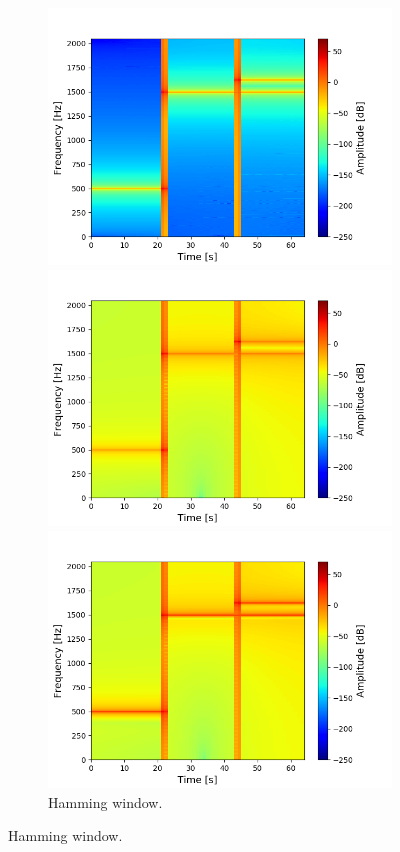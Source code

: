 \begin{figure}[H]
\centering
\begin{subfigure}{0.49\textwidth}
\centering

\includegraphics[width=\textwidth]{figures/stft_windows/hanning_10000.png}
\caption{Hann window.}
\label{fig:stft_hanning}
\includegraphics[width=\textwidth]{figures/stft_windows/hamming_10000.png}
\caption{Hamming window.}
\label{fig:stft_hamming}
\includegraphics[width=\textwidth]{figures/stft_windows/kaiser/10000/4.png}

\end{subfigure}
\end{figure}
